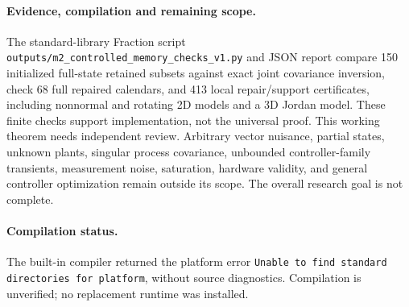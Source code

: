 \documentclass[11pt]{article}
\begin{document}
\paragraph{Evidence, compilation and remaining scope.}
The standard-library Fraction script
\texttt{outputs/m2\_controlled\_memory\_checks\_v1.py} and JSON report compare
150 initialized full-state retained subsets against exact joint covariance
inversion, check 68 full repaired calendars, and 413 local repair/support
certificates, including nonnormal and rotating 2D models and a 3D Jordan model.
These finite checks support implementation, not the universal proof.
This working theorem needs independent review.
Arbitrary vector nuisance, partial states, unknown plants, singular process
covariance, unbounded controller-family transients, measurement noise,
saturation, hardware validity, and general controller optimization remain
outside its scope. The overall research goal is not complete.
\paragraph{Compilation status.}
The built-in compiler returned the platform error
\texttt{Unable to find standard directories for platform}, without source
diagnostics. Compilation is unverified; no replacement runtime was installed.
\end{document}
